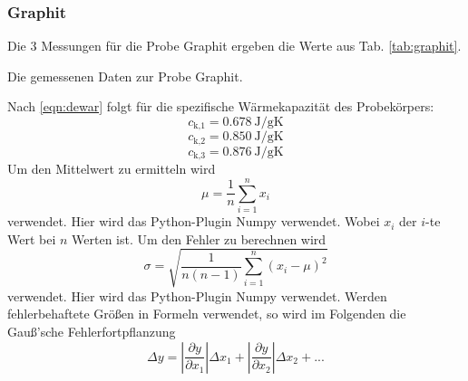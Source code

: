 \subsubsection{Graphit}
Die 3 Messungen für die Probe Graphit ergeben die Werte aus Tab. \ref{tab:graphit}.
\begin{table}
    \centering
    \caption{Die gemessenen Daten zur Probe Graphit. }
    \label{tab:graphit}  
\end{table}
Nach \eqref{eqn:dewar} folgt für die spezifische Wärmekapazität des Probekörpers:
\begin{equation}
    c_\text{k,1} = \SI{0.678}{\joule/\gram\kelvin}
\end{equation}
\begin{equation}
    c_\text{k,2} = \SI{0.850}{\joule/\gram\kelvin}
\end{equation}
\begin{equation}
    c_\text{k,3} = \SI{0.876}{\joule/\gram\kelvin}
\end{equation}
Um den Mittelwert zu ermitteln wird
\begin{equation}
    \mu = \frac{1}{n} \sum_{i=1}^n x_i
    \label{eqn:mittel}
\end{equation}
verwendet. Hier wird das Python-Plugin Numpy \cite{numpy} verwendet.
Wobei $x_i$ der $i$-te Wert bei $n$ Werten ist.
Um den Fehler zu berechnen wird
\begin{equation}
    \sigma = \sqrt{\frac{1}{n(n-1)} \sum_{i=1}^n (x_i - \mu)^2}
    \label{eqn:fehler}
\end{equation}
verwendet. Hier wird das Python-Plugin Numpy \cite{numpy} verwendet.
Werden fehlerbehaftete Größen in Formeln verwendet, so wird im Folgenden die Gauß'sche Fehlerfortpflanzung 
\begin{equation}
    \Delta y = \left|\frac{\partial y}{\partial x_1}\right| \Delta x_1 + \left|\frac{\partial y}{\partial x_2}\right| \Delta x_2 + ...
\end{equation}
